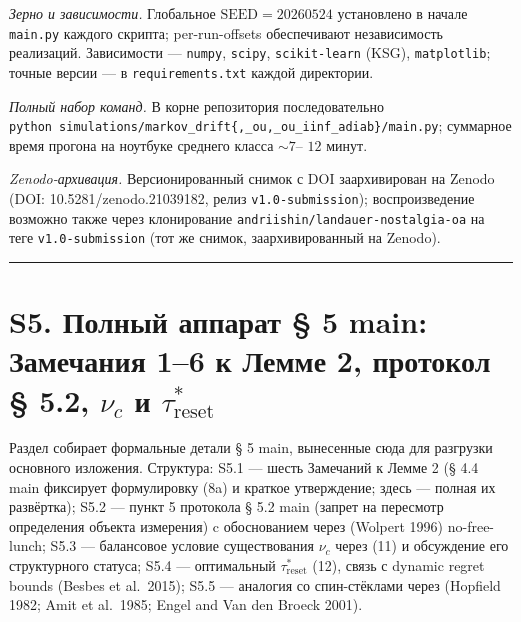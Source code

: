 \documentclass[pdflatex,sn-mathphys-ay]{sn-jnl}
\begin{document}
\emph{Зерно и зависимости.} Глобальное \(\text{SEED} = 20260524\) установлено в начале \texttt{main.py} каждого скрипта; per-run-offsets обеспечивают независимость реализаций. Зависимости --- \texttt{numpy}, \texttt{scipy}, \texttt{scikit-learn} (KSG), \texttt{matplotlib}; точные версии --- в \texttt{requirements.txt} каждой директории.



\emph{Полный набор команд.} В корне репозитория последовательно \texttt{python\ simulations/markov\_drift\{,\_ou,\_ou\_iinf\_adiab\}/main.py}; суммарное время прогона на ноутбуке среднего класса \(\sim 7\)-- \(12\) минут.



\emph{Zenodo-архивация.} Версионированный снимок с DOI заархивирован на Zenodo (DOI: 10.5281/zenodo.21039182, релиз \texttt{v1.0-submission}); воспроизведение возможно также через клонирование \texttt{andriishin/landauer-nostalgia-oa} на теге \texttt{v1.0-submission} (тот же снимок, заархивированный на Zenodo).



\begin{center}\rule{0.5\linewidth}{0.5pt}\end{center}



\section*{\texorpdfstring{S5. Полный аппарат § 5 main: Замечания 1--6 к Лемме 2, протокол § 5.2, \(\nu_c\) и \(\tau_{\text{reset}}^*\)}{S5. Полный аппарат § 5 main: Замечания 1--6 к Лемме 2, протокол § 5.2, \textbackslash nu\_c и \textbackslash tau\_\{\textbackslash text\{reset\}\}\^{}*}}\label{s5.-ux43fux43eux43bux43dux44bux439-ux430ux43fux43fux430ux440ux430ux442-5-main-ux437ux430ux43cux435ux447ux430ux43dux438ux44f-16-ux43a-ux43bux435ux43cux43cux435-2-ux43fux440ux43eux442ux43eux43aux43eux43b-5.2-nu_c-ux438-tau_textreset}



Раздел собирает формальные детали § 5 main, вынесенные сюда для разгрузки основного изложения. Структура: S5.1 --- шесть Замечаний к Лемме 2 (§ 4.4 main фиксирует формулировку (8a) и краткое утверждение; здесь --- полная их развёртка); S5.2 --- пункт 5 протокола § 5.2 main (запрет на пересмотр определения объекта измерения) c обоснованием через (Wolpert 1996) no-free-lunch; S5.3 --- балансовое условие существования \(\nu_c\) через (11) и обсуждение его структурного статуса; S5.4 --- оптимальный \(\tau_{\text{reset}}^*\) (12), связь с dynamic regret bounds (Besbes et al.~2015); S5.5 --- аналогия со спин-стёклами через (Hopfield 1982; Amit et al.~1985; Engel and Van den Broeck 2001).
\end{document}
